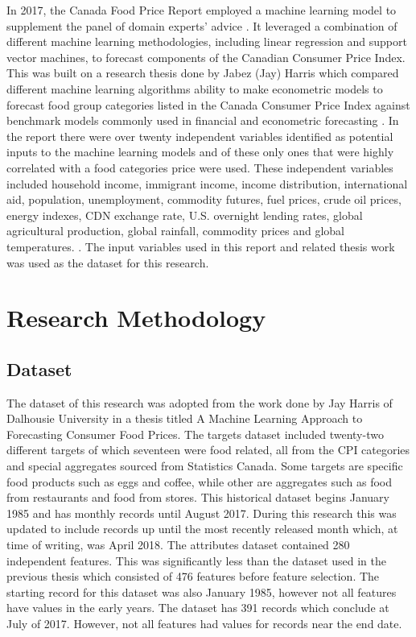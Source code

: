 \documentclass[12pt]{dalthesis}
\begin{document}
In 2017, the Canada Food Price Report employed a machine learning model to supplement the panel of domain experts’ advice \cite{foodreport17}. It leveraged a combination of different machine learning methodologies, including linear regression and support vector machines, to forecast components of the Canadian Consumer Price Index. This was built on a research thesis done by Jabez (Jay) Harris which compared different machine learning algorithms ability to make econometric models to forecast food group categories listed in the Canada Consumer Price Index against benchmark models commonly used in financial and econometric forecasting \cite{jay}. In the report there were over twenty independent variables identified as potential inputs to the machine learning models and of these only ones that were highly correlated with a food categories price were used. These independent variables included household income, immigrant income, income distribution, international aid, population, unemployment, commodity futures, fuel prices, crude oil prices, energy indexes, CDN exchange rate, U.S. overnight lending rates, global agricultural production, global rainfall, commodity prices and global temperatures. \cite{foodreport17}. The input variables used in this report and related thesis work was used as the dataset for this research.







\chapter{Research Methodology}

\section{Dataset}
The dataset of this research was adopted from the work done by Jay Harris of Dalhousie University in a thesis titled A Machine Learning Approach to Forecasting Consumer Food Prices. The targets dataset included twenty-two different targets of which seventeen were food related, all from the CPI categories and special aggregates sourced from Statistics Canada. Some targets are specific food products such as eggs and coffee, while other are aggregates such as food from restaurants and food from stores. This historical dataset begins January 1985 and has monthly records until August 2017. During this research this was updated to include records up until the most recently released month which, at time of writing, was April 2018.  The attributes dataset contained 280 independent features. This was significantly less than the dataset used in the previous thesis which consisted of 476 features before feature selection. The starting record for this dataset was also January 1985, however not all features have values in the early years. The dataset has 391 records which conclude at July of 2017. However, not all features had values for records near the end date. \\
\end{document}
